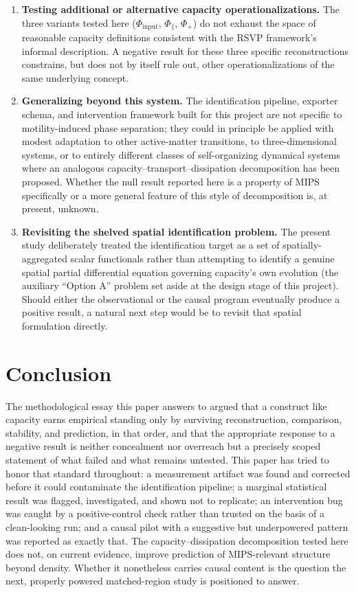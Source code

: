\documentclass[11pt]{article}
\begin{document}
\begin{enumerate}
\item \textbf{Testing additional or alternative capacity operationalizations.} The three variants tested here ($\Phi_{\text{input}}$, $\Phi_{\parallel}$, $\Phi_{+}$) do not exhaust the space of reasonable capacity definitions consistent with the RSVP framework's informal description. A negative result for these three specific reconstructions constrains, but does not by itself rule out, other operationalizations of the same underlying concept.

\item \textbf{Generalizing beyond this system.} The identification pipeline, exporter schema, and intervention framework built for this project are not specific to motility-induced phase separation; they could in principle be applied with modest adaptation to other active-matter transitions, to three-dimensional systems, or to entirely different classes of self-organizing dynamical systems where an analogous capacity--transport--dissipation decomposition has been proposed. Whether the null result reported here is a property of MIPS specifically or a more general feature of this style of decomposition is, at present, unknown.

\item \textbf{Revisiting the shelved spatial identification problem.} The present study deliberately treated the identification target as a set of spatially-aggregated scalar functionals rather than attempting to identify a genuine spatial partial differential equation governing capacity's own evolution (the auxiliary ``Option A'' problem set aside at the design stage of this project). Should either the observational or the causal program eventually produce a positive result, a natural next step would be to revisit that spatial formulation directly.
\end{enumerate}

\section{Conclusion}

The methodological essay this paper answers to argued that a construct like capacity earns empirical standing only by surviving reconstruction, comparison, stability, and prediction, in that order, and that the appropriate response to a negative result is neither concealment nor overreach but a precisely scoped statement of what failed and what remains untested. This paper has tried to honor that standard throughout: a measurement artifact was found and corrected before it could contaminate the identification pipeline; a marginal statistical result was flagged, investigated, and shown not to replicate; an intervention bug was caught by a positive-control check rather than trusted on the basis of a clean-looking run; and a causal pilot with a suggestive but underpowered pattern was reported as exactly that. The capacity--dissipation decomposition tested here does not, on current evidence, improve prediction of MIPS-relevant structure beyond density. Whether it nonetheless carries causal content is the question the next, properly powered matched-region study is positioned to answer.
\end{document}
